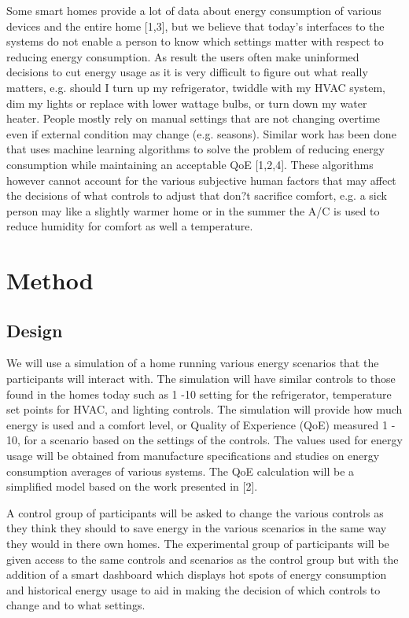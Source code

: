 \documentclass{sigchi}
\begin{document}
Some smart homes provide a lot of data about energy consumption of various devices and the entire home [1,3], but we believe that today's interfaces to the systems do not enable a person to know which settings matter with respect to reducing energy consumption. As result the users often make uninformed decisions to cut energy usage as it is very difficult to figure out what really matters, e.g. should I turn up my refrigerator, twiddle with my HVAC system, dim my lights or replace with lower wattage bulbs, or turn down my water heater. People mostly rely on manual settings that are not changing overtime even if external condition may change (e.g. seasons). Similar work has been done that uses machine learning algorithms to solve the problem of reducing energy consumption while maintaining an acceptable QoE [1,2,4]. These algorithms however cannot account for the various subjective human factors that may affect the decisions of what controls to adjust that don?t sacrifice comfort, e.g. a sick person may like a slightly warmer home or in the summer the A/C is used to reduce humidity for comfort as well a temperature.

\section{Method}

\subsection{Design}

We will use a simulation of a home running various energy scenarios that the participants will interact with. The simulation will have similar controls to those found in the homes today such as 1 -10 setting for the refrigerator, temperature set points for HVAC, and lighting controls. The simulation will provide how much energy is used and a comfort level, or Quality of Experience (QoE) measured 1 - 10, for a scenario based on the settings of the controls. The values used for energy usage will be obtained from manufacture specifications and studies on energy consumption averages of various systems. The QoE calculation will be a simplified model based on the work presented in [2].

A control group of participants will be asked to change the various controls as they think they should to save energy in the various scenarios in the same way they would in there own homes. The experimental group of participants will be given access to the same controls and scenarios as the control group but with the addition of a smart dashboard which displays hot spots of energy consumption and historical energy usage to aid in making the decision of which controls to change and to what settings.
\end{document}
